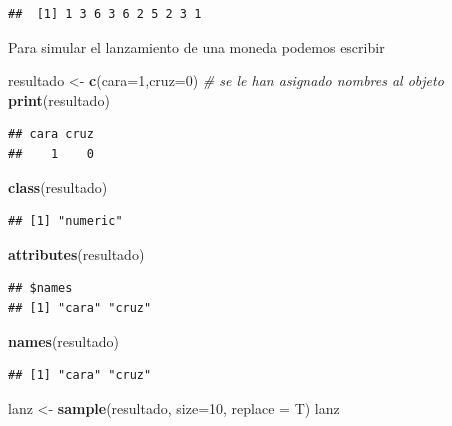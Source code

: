 \documentclass[]{book}
\newenvironment{Shaded}{\begin{snugshade}}{\end{snugshade}}
\newcommand{\KeywordTok}[1]{\textcolor[rgb]{0.13,0.29,0.53}{\textbf{#1}}}
\newcommand{\DataTypeTok}[1]{\textcolor[rgb]{0.13,0.29,0.53}{#1}}
\newcommand{\DecValTok}[1]{\textcolor[rgb]{0.00,0.00,0.81}{#1}}
\newcommand{\StringTok}[1]{\textcolor[rgb]{0.31,0.60,0.02}{#1}}
\newcommand{\CommentTok}[1]{\textcolor[rgb]{0.56,0.35,0.01}{\textit{#1}}}
\newcommand{\NormalTok}[1]{#1}
\begin{document}
\begin{verbatim}
##  [1] 1 3 6 3 6 2 5 2 3 1
\end{verbatim}

Para simular el lanzamiento de una moneda podemos escribir

\begin{Shaded}
\begin{Highlighting}[]
\NormalTok{resultado <-}\StringTok{ }\KeywordTok{c}\NormalTok{(}\DataTypeTok{cara=}\DecValTok{1}\NormalTok{,}\DataTypeTok{cruz=}\DecValTok{0}\NormalTok{) }\CommentTok{# se le han asignado nombres al objeto}
\KeywordTok{print}\NormalTok{(resultado)}
\end{Highlighting}
\end{Shaded}

\begin{verbatim}
## cara cruz 
##    1    0
\end{verbatim}

\begin{Shaded}
\begin{Highlighting}[]
\KeywordTok{class}\NormalTok{(resultado)}
\end{Highlighting}
\end{Shaded}

\begin{verbatim}
## [1] "numeric"
\end{verbatim}

\begin{Shaded}
\begin{Highlighting}[]
\KeywordTok{attributes}\NormalTok{(resultado)}
\end{Highlighting}
\end{Shaded}

\begin{verbatim}
## $names
## [1] "cara" "cruz"
\end{verbatim}

\begin{Shaded}
\begin{Highlighting}[]
\KeywordTok{names}\NormalTok{(resultado)}
\end{Highlighting}
\end{Shaded}

\begin{verbatim}
## [1] "cara" "cruz"
\end{verbatim}

\begin{Shaded}
\begin{Highlighting}[]
\NormalTok{lanz <-}\StringTok{ }\KeywordTok{sample}\NormalTok{(resultado, }\DataTypeTok{size=}\DecValTok{10}\NormalTok{, }\DataTypeTok{replace =}\NormalTok{ T)}
\NormalTok{lanz}
\end{Highlighting}
\end{Shaded}
\end{document}
